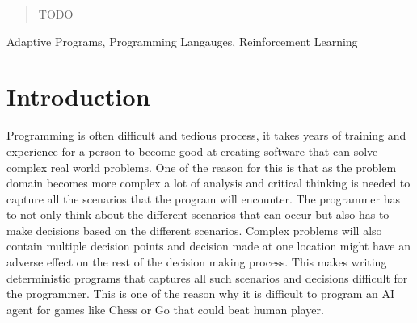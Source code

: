 \documentclass[conference]{IEEEtran}
\begin{document}




\maketitle


\begin{abstract}
TODO
\end{abstract}

\begin{IEEEkeywords}
Adaptive Programs, Programming Langauges, Reinforcement Learning
\end{IEEEkeywords}






%
\IEEEpeerreviewmaketitle



\section{Introduction}


Programming is often difficult and tedious process, it takes years of training
and experience for a person to become good at creating software that can solve complex real world
problems. One of the reason for this is that
as the problem domain becomes more complex a lot of analysis and critical thinking is needed to capture
all the scenarios that the program will encounter.
The programmer has to not only think about the different scenarios that can occur
but also has to make decisions based on the different scenarios.
Complex problems will also contain  multiple decision points and decision made at one location might have
an adverse effect on the rest of the decision making process.
This makes writing deterministic programs that captures all such scenarios and decisions difficult for the programmer.
This is one of the reason why it is difficult to program an AI agent for games like Chess or Go that could beat human
player.
\end{document}
